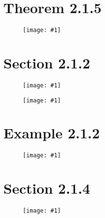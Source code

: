 \documentclass[a4paper, 10pt, dvipdfmx]{article}
\newcommand{\IMG}[2]{
    \begin{figure}[H]
        \centering
        \texttt{[image: \#1]}
        \caption{}
    \end{figure}
}
\begin{document}
\section*{Theorem 2.1.5}
\IMG{theorem2.1.5.png}{0.8}

\section*{Section 2.1.2}
\IMG{section2.1.2_vis.png}{0.9}
\IMG{section2.1.2_main.png}{0.9}

\section*{Example 2.1.2}
\IMG{example2.1.2.png}{0.8}

\section{Section 2.1.4}
\IMG{section2.1.4.png}{0.8}
\end{document}

